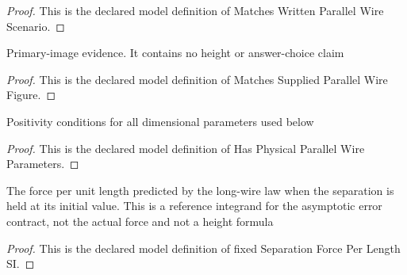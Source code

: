 \begin{proof}
  This is the declared model definition of Matches Written Parallel Wire Scenario.
\end{proof}
\begin{definition}
  \label{def:physics:phyx-mini-0971:phyxminiproblems-problemphyxmini0971-matchessuppliedparallelwirefigure}
  Primary-image evidence. It contains no height or answer-choice claim
\end{definition}
\begin{proof}
  This is the declared model definition of Matches Supplied Parallel Wire Figure.
\end{proof}
\begin{definition}
  \label{def:physics:phyx-mini-0971:phyxminiproblems-problemphyxmini0971-hasphysicalparallelwireparameters}
  Positivity conditions for all dimensional parameters used below
\end{definition}
\begin{proof}
  This is the declared model definition of Has Physical Parallel Wire Parameters.
\end{proof}
\begin{definition}
  \label{def:physics:phyx-mini-0971:phyxminiproblems-problemphyxmini0971-fixedseparationforceperlengthsi}
  The force per unit length predicted by the long-wire law when the separation is held at its initial value. This is a reference integrand for the asymptotic error contract, not the actual force and not a height formula
\end{definition}
\begin{proof}
  This is the declared model definition of fixed Separation Force Per Length SI.
\end{proof}
